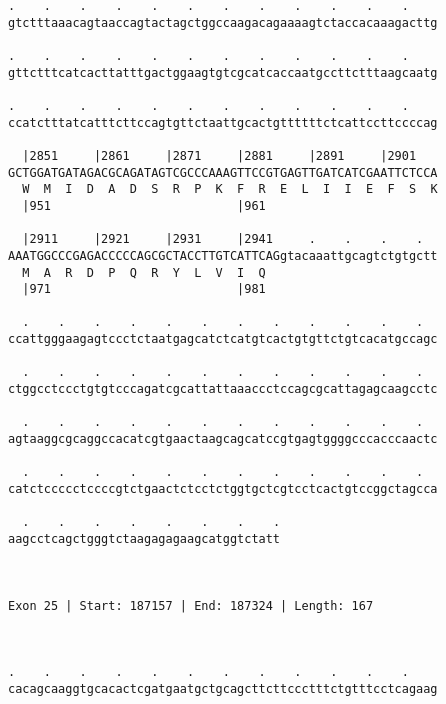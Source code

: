\documentclass{article}
\begin{document}
\begin{Verbatim}
.    .    .    .    .    .    .    .    .    .    .    .    
gtctttaaacagtaaccagtactagctggccaagacagaaaagtctaccacaaagacttg
                                                            
.    .    .    .    .    .    .    .    .    .    .    .    
gttctttcatcacttatttgactggaagtgtcgcatcaccaatgccttctttaagcaatg
                                                            
.    .    .    .    .    .    .    .    .    .    .    .    
ccatctttatcatttcttccagtgttctaattgcactgttttttctcattccttccccag
                                                            
  |2851     |2861     |2871     |2881     |2891     |2901   
GCTGGATGATAGACGCAGATAGTCGCCCAAAGTTCCGTGAGTTGATCATCGAATTCTCCA
  W  M  I  D  A  D  S  R  P  K  F  R  E  L  I  I  E  F  S  K
  |951                          |961                        
  
  |2911     |2921     |2931     |2941     .    .    .    .  
AAATGGCCCGAGACCCCCAGCGCTACCTTGTCATTCAGgtacaaattgcagtctgtgctt
  M  A  R  D  P  Q  R  Y  L  V  I  Q                        
  |971                          |981                        
  
  .    .    .    .    .    .    .    .    .    .    .    .  
ccattgggaagagtccctctaatgagcatctcatgtcactgtgttctgtcacatgccagc
                                                            
  .    .    .    .    .    .    .    .    .    .    .    .  
ctggcctccctgtgtcccagatcgcattattaaaccctccagcgcattagagcaagcctc
                                                            
  .    .    .    .    .    .    .    .    .    .    .    .  
agtaaggcgcaggccacatcgtgaactaagcagcatccgtgagtggggcccacccaactc
                                                            
  .    .    .    .    .    .    .    .    .    .    .    .  
catctccccctccccgtctgaactctcctctggtgctcgtcctcactgtccggctagcca
                                                            
  .    .    .    .    .    .    .    .
aagcctcagctgggtctaagagagaagcatggtctatt
                                      
                                      
 
Exon 25 | Start: 187157 | End: 187324 | Length: 167



.    .    .    .    .    .    .    .    .    .    .    .    
cacagcaaggtgcacactcgatgaatgctgcagcttcttccctttctgtttcctcagaag
                                                            

\end{Verbatim}
\end{document}
